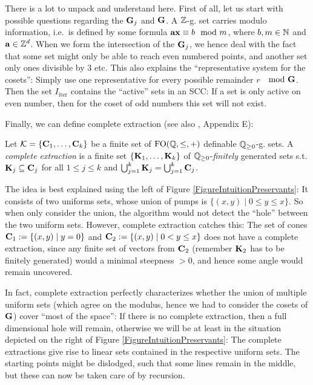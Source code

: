 There is a lot to unpack and understand here. First of all, let us start with possible questions regarding the \(\mathbf{G}_j\) and \(\mathbf{G}\). A \(\mathbb{Z}\)-g. set carries modulo information, i.e.\ is defined by some formula \(\mathbf{a} \mathbf{x} \equiv b \mod m\), where \(b,m \in \mathbb{N}\) and \(\mathbf{a} \in \mathbb{Z}^d\). When we form the intersection of the \(\mathbf{G}_j\), we hence deal with the fact that some set might only be able to reach even numbered points, and another set only ones divisible by \(3\) etc. This also explains the ``representative system for the cosets'': Simply use one representative for every possible remainder \(r\) \(\mod \vectSet{G}\). Then the set \(I_{\text{iter}}\) contains the ``active'' sets in an SCC: If a set is only active on even number, then for the coset of odd numbers this set will not exist. 

Finally, we can define complete extraction (see also \cite{Leroux13}, Appendix E): 

\begin{definition}
Let \(\mathcal{K}=\{\mathbf{C}_1, \dots, \mathbf{C}_k\}\) be a finite set of \(\operatorname{FO}(\mathbb{Q},\leq,+)\) definable \(\mathbb{Q}_{\geq 0}\)-g. sets. A \emph{complete extraction} is a finite set \(\{\mathbf{K}_1, \dots, \mathbf{K}_k\}\) of \(\mathbb{Q}_{\geq 0}\)-\emph{finitely} generated sets s.t. \(\mathbf{K}_j \subseteq \mathbf{C}_j\) for all \(1 \leq j \leq k\) and \(\bigcup_{j=1}^k \mathbf{K}_j =\bigcup_{j=1}^k \mathbf{C}_j\).
\end{definition}

The idea is best explained using the left of Figure \ref{FigureIntuitionPreservants}: It consists of two uniforms sets, whose union of pumps is \(\{(x,y) \mid 0 \leq y \leq x\}\). So when only consider the union, the algorithm would not detect the ``hole'' between the two uniform sets. However, complete extraction catches this: The set of cones \(\mathbf{C}_1:=\{(x,y) \mid y=0\}\) and \(\mathbf{C}_2:=\{(x,y) \mid 0 < y \leq x\}\) does not have a complete extraction, since any finite set of vectors from \(\mathbf{C}_2\) (remember \(\mathbf{K}_2\) has to be finitely generated) would a minimal steepness \(>0\), and hence some angle would remain uncovered. 

In fact, complete extraction perfectly characterizes whether the union of multiple uniform sets (which agree on the modulus, hence we had to consider the cosets of \(\mathbf{G}\)) cover ``most of the space'': If there is no complete extraction, then a full dimensional hole will remain, otherwise we will be at least in the situation depicted on the right of Figure \ref{FigureIntuitionPreservants}: The complete extractions give rise to linear sets contained in the respective uniform sets. The starting points might be dislodged, such that some lines remain in the middle, but these can now be taken care of by recursion.

